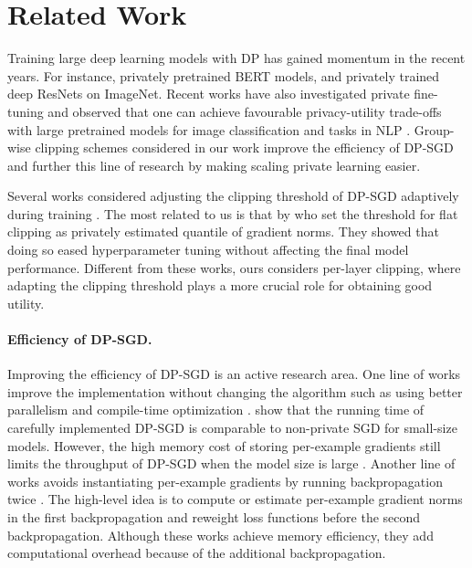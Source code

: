 \section{Related Work}


Training large deep learning models with DP has gained momentum in the recent years. For instance, \cite{anil2021large} privately pretrained BERT models, and \cite{kurakin2022toward} privately trained deep ResNets on ImageNet.
Recent works have also investigated private fine-tuning \citep{kerrigan2020differentially,tian2021seqpate,senge2021one,hoory2021learning,basu2021benchmarking,yu2021large} and observed that one can achieve favourable privacy-utility trade-offs with large pretrained models for image classification \citep{luo2021scalable,tramer2021differentially,golatkar2022mixed,de2022unlocking,mehta2022large} and tasks in NLP \citep{yu2022differentially,li2022large,li2022does}.
Group-wise clipping schemes considered in our work improve the efficiency of DP-SGD and further this line of research by making scaling private learning easier.


Several works considered adjusting the clipping threshold of DP-SGD adaptively during training \citep{pichapati2019adaclip,asi2021private}. 
The most related to us is that by \cite{andrew2019differentially} who set the threshold for flat clipping as privately estimated quantile of gradient norms.
They showed that doing so eased hyperparameter tuning without affecting the final model performance.
Different from these works, ours considers per-layer clipping, where adapting the clipping threshold plays a more crucial role for obtaining good utility. 


\paragraph{Efficiency of DP-SGD.} Improving the efficiency of DP-SGD is an active research area. One line of works improve the implementation  without changing the algorithm such as using better parallelism and compile-time optimization \citep{subramani2021enabling,anil2021large}. 
\cite{subramani2021enabling} show that the running time of carefully implemented DP-SGD is comparable  to non-private SGD for small-size models. 
However, the high memory cost of storing per-example gradients still limits the throughput of DP-SGD when the model size is large \citep{li2022large}. 
Another line of works avoids instantiating per-example gradients by running backpropagation twice \citep{goodfellow2015efficient,lee2021scaling,bu2021fast,li2022large,bu2022scalable}. The high-level idea is to compute or estimate per-example gradient norms in the first backpropagation and reweight loss functions before the second backpropagation.  Although these works achieve memory efficiency, they add computational overhead because of the additional backpropagation.

